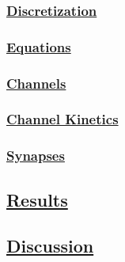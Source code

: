 \documentclass[12pt]{article}
\begin{document}
\subsubsection*{\href{../pub-purkinje-deschutter-discretization/pub-purkinje-deschutter-discretization.tex}{\bf Discretization}}

\subsubsection*{\href{../pub-purkinje-deschutter-equations/pub-purkinje-deschutter-equations.tex}{\bf Equations}}

\subsubsection*{\href{../pub-purkinje-deschutter-channels/pub-purkinje-deschutter-channels.tex}{\bf Channels}}

\subsubsection*{\href{../pub-purkinje-deschutter-kinetics/pub-purkinje-deschutter-kinetics.tex}{\bf Channel Kinetics}}

\subsubsection*{\href{../pub-purkinje-deschutter-synapses/pub-purkinje-deschutter-synapses.tex}{\bf Synapses}}

\subsection*{\href{../pub-purkinje-deschutter-results/pub-purkinje-deschutter-results.tex}{\bf Results}}

\subsection*{\href{../pub-purkinje-deschutter-discussion/pub-purkinje-deschutter-discussion.tex}{\bf Discussion}}
\end{document}
